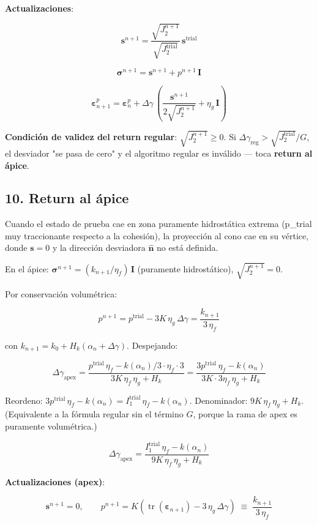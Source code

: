 \documentclass[11pt,letterpaper,oneside]{report}
\begin{document}
\textbf{Actualizaciones}:

\[
\mathbf s^{n+1} = \frac{\sqrt{J_2^{n+1}}}{\sqrt{J_2^\text{trial}}}\,\mathbf s^\text{trial}
\]

\[
\boldsymbol\sigma^{n+1} = \mathbf s^{n+1} + p^{n+1}\,\mathbf I
\]

\[
\boldsymbol\varepsilon^p_{n+1} = \boldsymbol\varepsilon^p_n + \Delta\gamma\,\left(\frac{\mathbf s^{n+1}}{2\sqrt{J_2^{n+1}}} + \eta_g\,\mathbf I\right)
\]

\textbf{Condición de validez del return regular}: $\sqrt{J_2^{n+1}} \geq 0$. Si $\Delta\gamma_\text{reg} > \sqrt{J_2^\text{trial}}/G$, el desviador "se pasa de cero" y el algoritmo regular es inválido --- toca \textbf{return al ápice}.

\subsection{10. Return al ápice}

Cuando el estado de prueba cae en zona puramente hidrostática extrema (p\_trial muy traccionante respecto a la cohesión), la proyección al cono cae en su vértice, donde $\mathbf s = 0$ y la dirección desviadora $\hat{\mathbf n}$ no está definida.

En el ápice: $\boldsymbol\sigma^{n+1} = (k_{n+1}/\eta_f)\,\mathbf I$ (puramente hidrostático), $\sqrt{J_2^{n+1}} = 0$.

Por conservación volumétrica:

\[
p^{n+1} = p^\text{trial} - 3K\,\eta_g\,\Delta\gamma = \frac{k_{n+1}}{3\,\eta_f}
\]

con $k_{n+1} = k_0 + H_k(\alpha_n + \Delta\gamma)$. Despejando:

\[
\boxed{\;\Delta\gamma_\text{apex} = \frac{p^\text{trial}\,\eta_f - k(\alpha_n)/3 \cdot \eta_f \cdot 3}{3K\,\eta_f\,\eta_g + H_k} = \frac{3 p^\text{trial}\,\eta_f - k(\alpha_n)}{3K \cdot 3\eta_f\,\eta_g + H_k}\;}
\]

Reordeno: $3p^\text{trial}\,\eta_f - k(\alpha_n) = I_1^\text{trial}\,\eta_f - k(\alpha_n)$. Denominador: $9K\,\eta_f\,\eta_g + H_k$. (Equivalente a la fórmula regular sin el término $G$, porque la rama de apex es puramente volumétrica.)

\[
\Delta\gamma_\text{apex} = \frac{I_1^\text{trial}\,\eta_f - k(\alpha_n)}{9K\,\eta_f\,\eta_g + H_k}
\]

\textbf{Actualizaciones (apex)}:

\[
\mathbf s^{n+1} = 0,\qquad p^{n+1} = K(\operatorname{tr}(\boldsymbol\varepsilon_{n+1}) - 3\,\eta_g\,\Delta\gamma) \;\equiv\; \frac{k_{n+1}}{3\,\eta_f}
\]
\end{document}
